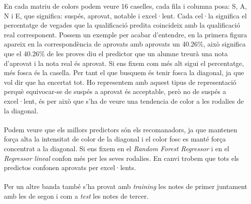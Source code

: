 \documentclass[12pt,a4paper,catalan]{article}
\begin{document}
En cada matriu de colors podem veure 16 caselles, cada fila i columna posa: S, A, N i E, que significa: suspés, aprovat, notable i excel·lent. Cada cel·la significa el percentatge de vegades que la qualificació predita coincideix amb la qualificació real corresponent. Possem un exemple per acabar d'entendre, en la primera figura apareix en la correspondència de aprovats amb aprovats un 40.26\%, això significa que el 40.26\% de les proves diu el predictor que un alumne treurà una nota d'aprovat i la nota real és aprovat. Si ens fixem com més alt sigui el percentatge, més fosca és la casella. Per tant el que busquem és tenir fosca la diagonal, ja que vol dir que ha encertat tot. Ho representem amb aquest tipus de representació perquè equivocar-se de suspés a aprovat és acceptable, però no de suspés a excel·lent, és per això que s'ha de veure una tendencia de color a les rodalies de la diagonal.
\\
\\
Podem veure que els millors predictors són els recomanadors, ja que mantenen força alta la intensitat de color de la diagonal i el color fosc es manté força concentrat a la diagonal. Si ens fixem en el \textit{Random Forest Regressor} i en el \textit{Regressor lineal} confon més per les seves rodalies. En canvi trobem que tots els predictos confonen aprovats per excel·lents.
\\
\\
Per un altre banda també s'ha provat amb \textit{training} les notes de primer juntament amb les de segon i com a \textit{test} les notes de tercer.
\end{document}
